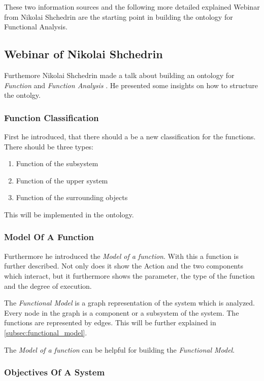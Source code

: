 \documentclass[11pt,a4paper]{article}
\begin{document}
These two information sources and the following more detailed explained Webinar from Nikolai Shchedrin are the starting point in building the ontology for Functional Analysis.


\subsection{Webinar of Nikolai Shchedrin}

Furthemore Nikolai Shchedrin made a talk about building an ontology for \textit{Function} and \textit{Function Analysis} \cite{WebinarFunctionAnalysis}.
He presented some insights on how to structure the ontolgy.

\subsubsection{Function Classification}

First he introduced, that there should a be a new classification for the functions. 
There should be three types: 

\begin{enumerate}[noitemsep]
	\item Function of the subsystem
	\item Function of the upper system
	\item Function of the surrounding objects
\end{enumerate}

This will be implemented in the ontology. 

\subsubsection{Model Of A Function}

Furthermore he introduced the \textit{Model of a function}.
With this a function is further described. 
Not only does it show the Action and the two components which interact, but it furthermore shows the parameter, the type of the function and the degree of execution.

The \textit{Functional Model} is a graph representation of the system which is analyzed. 
Every node in the graph is a component or a subsystem of the system. 
The functions are represented by edges. 
This will be further explained in \ref{subsec:functional_model}.

The \textit{Model of a function} can be helpful for building the \textit{Functional Model}.

\subsubsection{Objectives Of A System}
\end{document}

